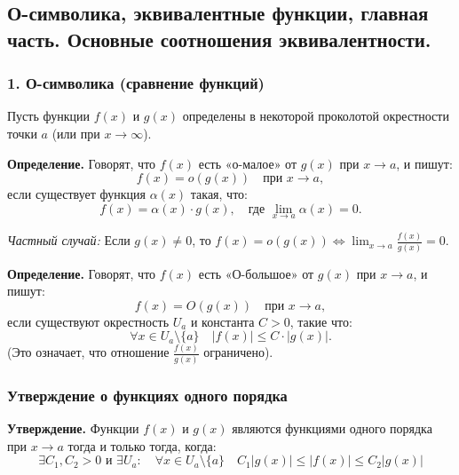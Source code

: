 \newpage
\subsection{О-символика, эквивалентные функции, главная часть. Основные соотношения эквивалентности.}

\subsubsection*{1. О-символика (сравнение функций)}

Пусть функции $f(x)$ и $g(x)$ определены в некоторой проколотой окрестности точки $a$ (или при $x \to \infty$).

\begin{tcolorbox}[title=О-малое]
	\textbf{Определение.} Говорят, что $f(x)$ есть «о-малое» от $g(x)$ при $x \to a$, и пишут:
	\[ f(x) = o(g(x)) \quad \text{при } x \to a, \]
	если существует функция $\alpha(x)$ такая, что:
	\[ f(x) = \alpha(x) \cdot g(x), \quad \text{где } \lim_{x\to a} \alpha(x) = 0. \]
	
	\textit{Частный случай:} Если $g(x) \neq 0$, то $f(x) = o(g(x)) \Leftrightarrow \lim_{x\to a} \frac{f(x)}{g(x)} = 0$.
\end{tcolorbox}

\begin{tcolorbox}[title=О-большое]
	\textbf{Определение.} Говорят, что $f(x)$ есть «О-большое» от $g(x)$ при $x \to a$, и пишут:
	\[ f(x) = O(g(x)) \quad \text{при } x \to a, \]
	если существуют окрестность $U_a$ и константа $C > 0$, такие что:
	\[ \forall x \in U_a \setminus \{a\} \quad |f(x)| \le C \cdot |g(x)|. \]
	(Это означает, что отношение $\frac{f(x)}{g(x)}$ ограничено).
\end{tcolorbox}

\subsubsection*{Утверждение о функциях одного порядка}
\textbf{Утверждение.} Функции $f(x)$ и $g(x)$ являются функциями одного порядка при $x \to a$ тогда и только тогда, когда:
\[ \exists C_1, C_2 > 0 \text{ и } \exists U_a: \quad \forall x \in U_a \setminus \{a\} \quad C_1 |g(x)| \le |f(x)| \le C_2 |g(x)| \]


